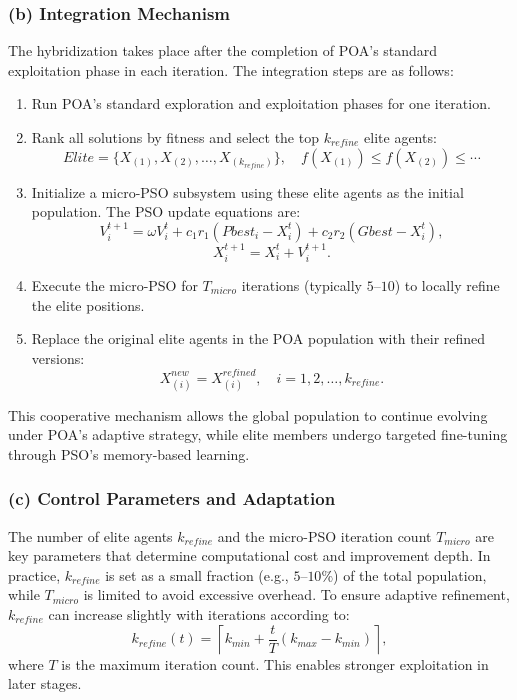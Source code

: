 \documentclass[a4paper,12pt]{article}
\begin{document}
\subsubsection*{(b) Integration Mechanism}
The hybridization takes place after the completion of POA’s standard exploitation phase in each iteration. The integration steps are as follows:
\begin{enumerate}
    \item Run POA’s standard exploration and exploitation phases for one iteration.
    \item Rank all solutions by fitness and select the top $k_{refine}$ elite agents:
    \[
    Elite = \{X_{(1)}, X_{(2)}, \ldots, X_{(k_{refine})}\}, \quad f(X_{(1)}) \le f(X_{(2)}) \le \cdots
    \]
    \item Initialize a micro-PSO subsystem using these elite agents as the initial population. The PSO update equations are:
    \[
    V_i^{t+1} = \omega V_i^t + c_1 r_1 (Pbest_i - X_i^t) + c_2 r_2 (Gbest - X_i^t),
    \]
    \[
    X_i^{t+1} = X_i^t + V_i^{t+1}.
    \]
    \item Execute the micro-PSO for $T_{micro}$ iterations (typically $5$--$10$) to locally refine the elite positions.
    \item Replace the original elite agents in the POA population with their refined versions:
    \[
    X_{(i)}^{new} = X_{(i)}^{refined}, \quad i = 1,2,\ldots,k_{refine}.
    \]
\end{enumerate}
This cooperative mechanism allows the global population to continue evolving under POA’s adaptive strategy, while elite members undergo targeted fine-tuning through PSO’s memory-based learning.

\subsubsection*{(c) Control Parameters and Adaptation}
The number of elite agents $k_{refine}$ and the micro-PSO iteration count $T_{micro}$ are key parameters that determine computational cost and improvement depth. In practice, $k_{refine}$ is set as a small fraction (e.g., $5$--$10\%$) of the total population, while $T_{micro}$ is limited to avoid excessive overhead. To ensure adaptive refinement, $k_{refine}$ can increase slightly with iterations according to:
\begin{equation}
k_{refine}(t) = \left\lceil k_{min} + \frac{t}{T}(k_{max} - k_{min}) \right\rceil,
\end{equation}
where $T$ is the maximum iteration count. This enables stronger exploitation in later stages.
\end{document}
